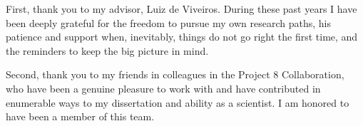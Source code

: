 
First, thank you to my advisor, Luiz de Viveiros. During these past years I have been deeply grateful for the freedom to pursue my own research paths, his patience and support when, inevitably, things do not go right the first time, and the reminders to keep the big picture in mind. 

Second, thank you to my friends in colleagues in the Project 8 Collaboration, who have been a genuine pleasure to work with and have contributed in enumerable ways to my dissertation and ability as a scientist. I am honored to have been a member of this team.
